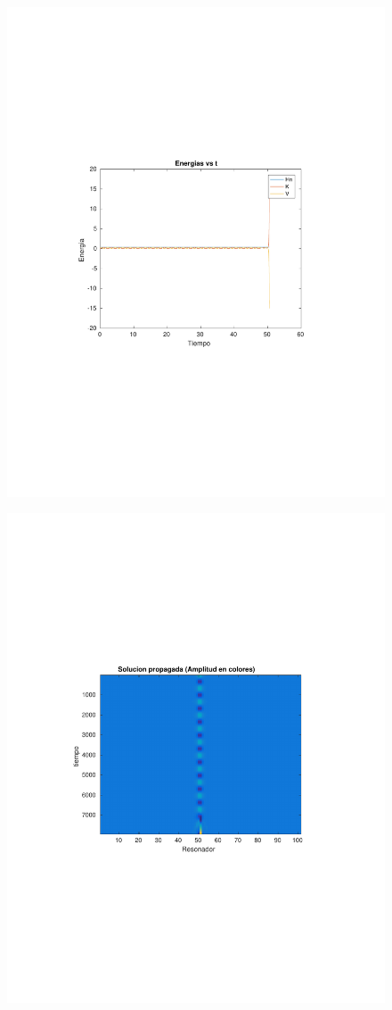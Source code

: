 \documentclass[10pt,a4paper]{article}
\begin{document}
\begin{figure}[h!]
\centering 
\includegraphics[scale=0.8]{E2-505.pdf}
\end{figure}


\begin{figure}[h!]
\centering 
\includegraphics[scale=0.8]{SP2-505.pdf}
\end{figure}
\end{document}
